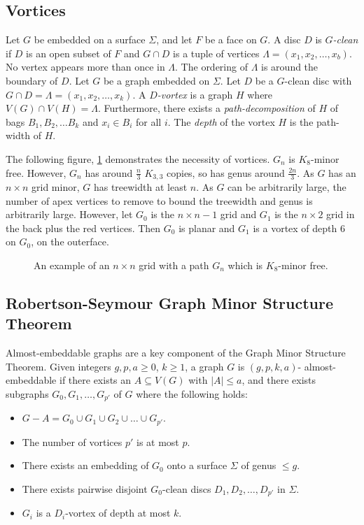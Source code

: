 \subsection{Vortices}\label{sssec:vortices}
Let \(G\) be embedded on a surface \(\Sigma\), and let \(F\) be a face on \(G\). A disc $D$ is \textit{$G$-clean} if $D$ is an open subset of $F$ and $G \cap D$ is a tuple of vertices \(\Lambda = (x_1, x_2, \ldots, x_b)\). No vertex appears more than once in $\Lambda$. The ordering of $\Lambda$ is around the boundary of $D$. 
Let $G$ be a graph embedded on $\Sigma$. Let $D$ be a $G$-clean disc with $G \cap D = \Lambda = (x_1, x_2, \ldots, x_k)$. A \textit{$D$-vortex} is a graph $H$ where $V(G) \cap V(H) = \Lambda$. Furthermore, there exists a \textit{path-decomposition} of \(H\) of bags \(B_1, B_2, \ldots B_k\) and \(x_i \in B_i\) for all \(i\). The \textit{depth} of the vortex $H$ is the path-width of $H$. 

The following figure, \cref{fig:tenniscourt} demonstrates the necessity of vortices. $G_n$ is $K_8$-minor free. However, $G_n$ has around $\frac{n}{3}$ $K_{3,3}$ copies, so has genus around $\frac{2n}{3}$. As $G$ has an $n \times n$ grid minor, $G$ has treewidth at least $n$. As $G$ can be arbitrarily large, the number of apex vertices to remove to bound the treewidth and genus is arbitrarily large. However, let $G_0$ is the $n \times n - 1$ grid and $G_1$ is the $n \times 2$ grid in the back plus the red vertices. Then $G_0$ is planar and $G_1$ is a vortex of depth 6 on $G_0$, on the outerface. 

\begin{figure}[h]
	\centering
	
	\caption[Graph vortex counterexample]{An example of an $n \times n$ grid with a path $G_n$ which is \(K_8\)-minor free.}\label{fig:tenniscourt}
\end{figure}
\subsection{Robertson-Seymour Graph Minor Structure Theorem}\label{ssec:Robertson_Seymour_Graph_Structure}
Almost-embeddable graphs are a key component of the Graph Minor Structure Theorem. Given integers \(g, p, a \geq 0\), \(k \geq 1\), a graph \(G\) is \((g, p, k, a)\)- almost-embeddable if there exists an \(A \subseteq V(G)\) with \(|A| \leq a\), and there exists subgraphs \(G_0, G_1, \ldots,  G_{p'}\) of \(G\) where the following holds:
\begin{itemize}
	\item \(G - A = G_0 \cup G_1 \cup G_2 \cup \ldots \cup G_{p'}\).
	\item The number of vortices $p'$ is at most $p$.
	\item There exists an embedding of \(G_0\) onto a surface \(\Sigma\) of genus \(\leq g\).
	\item There exists pairwise disjoint \(G_0\)-clean discs \(D_1, D_2, \ldots, D_{p'}\) in \(\Sigma\).
	\item \(G_i\) is a \(D_i\)-vortex of depth at most \(k\).
\end{itemize}

